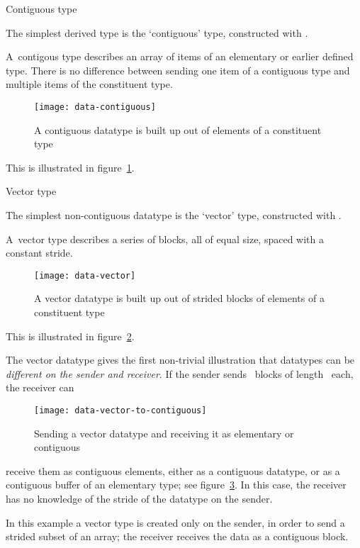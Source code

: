  {Contiguous type}
\label{sec:data:contiguous}

The simplest derived type is the `contiguous' type,
constructed with .

A~contigous type describes an array of items
of an elementary or earlier defined type. There is no difference between sending
one item of a contiguous type and multiple items of the constituent type.
\begin{figure}[ht]
  \texttt{[image: data-contiguous]}
  \caption{A contiguous datatype is built up out of elements of a constituent type}
  \label{fig:data-contiguous}
\end{figure}
This is illustrated in figure~\ref{fig:data-contiguous}.



 {Vector type}
\label{sec:data:vector}

The simplest non-contiguous datatype is the `vector' type, constructed with
.

A~vector type describes a series of blocks, all 
of equal size, spaced with a constant stride.
\begin{figure}[ht]
  \texttt{[image: data-vector]}
  \caption{A vector datatype is built up out of strided blocks of elements of a constituent type}
  \label{fig:data-vector}
\end{figure}
This is illustrated in figure~\ref{fig:data-vector}.

The vector datatype gives the first non-trivial illustration that
datatypes can be \emph{different on the sender and
  receiver}. If the
sender sends ~blocks of length~ each, the receiver can
%
\begin{figure}[ht]
  \texttt{[image: data-vector-to-contiguous]}
  \caption{Sending a vector datatype and receiving it as elementary or
    contiguous}
  \label{fig:data-vector-to-contiguous}
\end{figure}
%
receive them as  contiguous elements, either as a contiguous
datatype, or as a contiguous buffer of an elementary type; see
figure~\ref{fig:data-vector-to-contiguous}. In this case, the receiver
has no knowledge of the stride of the datatype on the sender.

In this example a vector type is created only on the sender, in order to send
a strided subset of an array; the receiver receives the data as a contiguous block.
%
%

